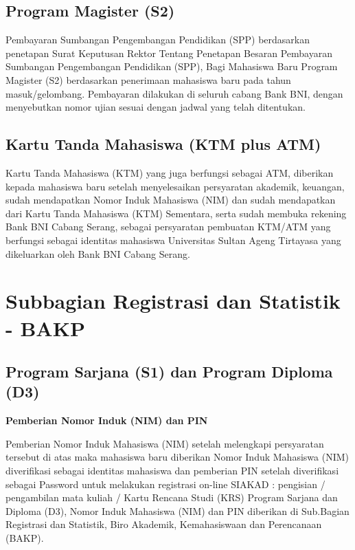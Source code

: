 \documentclass[
]{book}
\begin{document}
\hypertarget{program-magister-s2-1}{%
\subsection{Program Magister (S2)}\label{program-magister-s2-1}}

Pembayaran Sumbangan Pengembangan Pendidikan (SPP) berdasarkan penetapan Surat Keputusan Rektor Tentang Penetapan Besaran Pembayaran Sumbangan Pengembangan Pendidikan (SPP), Bagi Mahasiswa Baru Program Magister (S2) berdasarkan penerimaan mahasiswa baru pada tahun masuk/gelombang. Pembayaran dilakukan di seluruh cabang Bank BNI, dengan menyebutkan nomor ujian sesuai dengan jadwal yang telah ditentukan.

\hypertarget{kartu-tanda-mahasiswa-ktm-plus-atm}{%
\subsection{Kartu Tanda Mahasiswa (KTM plus ATM)}\label{kartu-tanda-mahasiswa-ktm-plus-atm}}

Kartu Tanda Mahasiswa (KTM) yang juga berfungsi sebagai ATM, diberikan kepada mahasiswa baru setelah menyelesaikan persyaratan akademik, keuangan, sudah mendapatkan Nomor Induk Mahasiswa (NIM) dan sudah mendapatkan dari Kartu Tanda Mahasiswa (KTM) Sementara, serta sudah membuka rekening Bank BNI Cabang Serang, sebagai persyaratan pembuatan KTM/ATM yang berfungsi sebagai identitas mahasiswa Universitas Sultan Ageng Tirtayasa yang dikeluarkan oleh Bank BNI Cabang Serang.

\hypertarget{subbagian-registrasi-dan-statistik---bakp}{%
\section{Subbagian Registrasi dan Statistik - BAKP}\label{subbagian-registrasi-dan-statistik---bakp}}

\hypertarget{program-sarjana-s1-dan-program-diploma-d3}{%
\subsection{Program Sarjana (S1) dan Program Diploma (D3)}\label{program-sarjana-s1-dan-program-diploma-d3}}

\textbf{Pemberian Nomor Induk (NIM) dan PIN}

Pemberian Nomor Induk Mahasiswa (NIM) setelah melengkapi persyaratan tersebut di atas maka mahasiswa baru diberikan Nomor Induk Mahasiswa (NIM) diverifikasi sebagai identitas mahasiswa dan pemberian PIN setelah diverifikasi sebagai Password untuk melakukan registrasi on-line SIAKAD : pengisian / pengambilan mata kuliah / Kartu Rencana Studi (KRS) Program Sarjana dan Diploma (D3), Nomor Induk Mahasiswa (NIM) dan PIN diberikan di Sub.Bagian Registrasi dan Statistik, Biro Akademik, Kemahasiswaan dan Perencanaan (BAKP).
\end{document}
